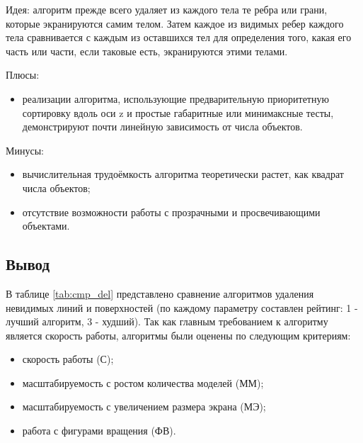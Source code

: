 Идея: алгоритм прежде всего удаляет из каждого тела те ребра или грани, которые экранируются самим телом. Затем каждое из видимых ребер каждого тела сравнивается с каждым из оставшихся тел для определения того, какая его часть или части, если таковые есть, экранируются этими телами.

Плюсы:
\begin{itemize}
    \item реализации алгоритма, использующие предварительную приоритетную сортировку вдоль оси z и простые габаритные или минимаксные тесты, демонстрируют почти линейную зависимость от числа объектов\cite{robert}.
\end{itemize}

Минусы:
\begin{itemize}
    \item вычислительная трудоёмкость алгоритма теоретически растет, как квадрат числа объектов\cite{robert};
    \item отсутствие возможности работы с прозрачными и просвечивающими объектами.
\end{itemize}

\subsection*{Вывод}

В таблице \ref{tab:cmp_del} представлено сравнение алгоритмов\cite{rogers} удаления невидимых линий и поверхностей (по каждому параметру составлен рейтинг: 1 - лучший алгоритм, 3 - худший). Так как главным требованием к алгоритму является скорость работы, алгоритмы были оценены по следующим критериям:
\begin{itemize}
    \item скорость работы (С);
    \item масштабируемость с ростом количества моделей (ММ);
    \item масштабируемость с увеличением размера экрана (МЭ);
    \item работа с фигурами вращения (ФВ).
\end{itemize}


